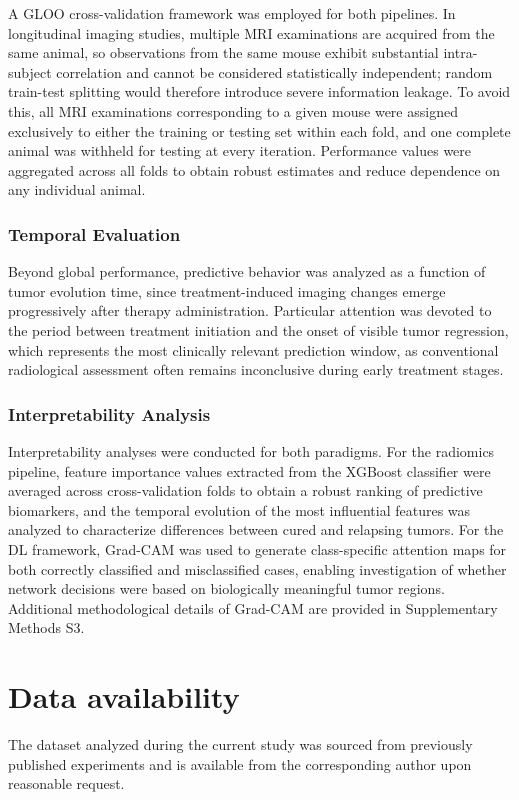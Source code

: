 \documentclass{article}
\begin{document}
A GLOO cross-validation framework was employed for both pipelines. In longitudinal imaging studies, multiple MRI examinations are acquired from the same animal, so observations from the same mouse exhibit substantial intra-subject correlation and cannot be considered statistically independent; random train-test splitting would therefore introduce severe information leakage. To avoid this, all MRI examinations corresponding to a given mouse were assigned exclusively to either the training or testing set within each fold, and one complete animal was withheld for testing at every iteration. Performance values were aggregated across all folds to obtain robust estimates and reduce dependence on any individual animal.

\subsubsection{Temporal Evaluation}

Beyond global performance, predictive behavior was analyzed as a function of tumor evolution time, since treatment-induced imaging changes emerge progressively after therapy administration. Particular attention was devoted to the period between treatment initiation and the onset of visible tumor regression, which represents the most clinically relevant prediction window, as conventional radiological assessment often remains inconclusive during early treatment stages.

\subsubsection{Interpretability Analysis}

Interpretability analyses were conducted for both paradigms. For the radiomics pipeline, feature importance values extracted from the XGBoost classifier were averaged across cross-validation folds to obtain a robust ranking of predictive biomarkers, and the temporal evolution of the most influential features was analyzed to characterize differences between cured and relapsing tumors. For the DL framework, Grad-CAM \cite{selvaraju2017gradcam} was used to generate class-specific attention maps for both correctly classified and misclassified cases, enabling investigation of whether network decisions were based on biologically meaningful tumor regions. Additional methodological details of Grad-CAM are provided in Supplementary Methods S3.

\section*{Data availability}
The dataset analyzed during the current study was sourced from previously published experiments and is available from the corresponding author upon reasonable request.
\end{document}
